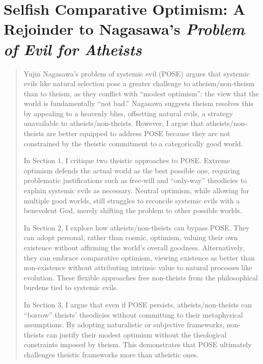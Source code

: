 
\chapter{Selfish Comparative Optimism: A Rejoinder to Nagasawa's \emph{Problem of Evil for Atheists}}


\renewcommand*{\thesection}{Section~\arabic{section}:} 
\renewcommand*{\thesubsection}{\arabic{section}.\arabic{subsection}}


\begin{quote}
Yujin Nagasawa's problem of systemic evil (POSE) argues that systemic
evils like natural selection pose a greater challenge to
atheism/non-theism than to theism, as they conflict with ``modest
optimism'': the view that the world is fundamentally ``not bad.''
Nagasawa suggests theism resolves this by appealing to a heavenly bliss,
offsetting natural evils, a strategy unavailable to
atheists/non-theists. However, I argue that atheists/non-theists are
better equipped to address POSE because they are not constrained by the
theistic commitment to a categorically good world.

In Section $1$, I critique two theistic approaches to POSE. Extreme
optimism defends the actual world as the best possible one, requiring
problematic justifications such as free-will and ``only-way'' theodicies
to explain systemic evils as necessary. Neutral optimism, while allowing
for multiple good worlds, still struggles to reconcile systemic evils
with a benevolent God, merely shifting the problem to other possible
worlds.

In Section $2$, I explore how atheists/non-theists can bypass POSE. They
can adopt personal, rather than cosmic, optimism, valuing their own
existence without affirming the world's overall goodness. Alternatively,
they can embrace comparative optimism, viewing existence as better than
non-existence without attributing intrinsic value to natural processes
like evolution. These flexible approaches free non-theists from the
philosophical burdens tied to systemic evils.

In Section $3$, I argue that even if POSE persists, atheists/non-theists
can ``borrow'' theists' theodicies without committing to their
metaphysical assumptions. By adopting naturalistic or subjective
frameworks, non-theists can justify their modest optimism without the
theological constraints imposed by theism. This demonstrates that POSE
ultimately challenges theistic frameworks more than atheistic ones.
\end{quote}

